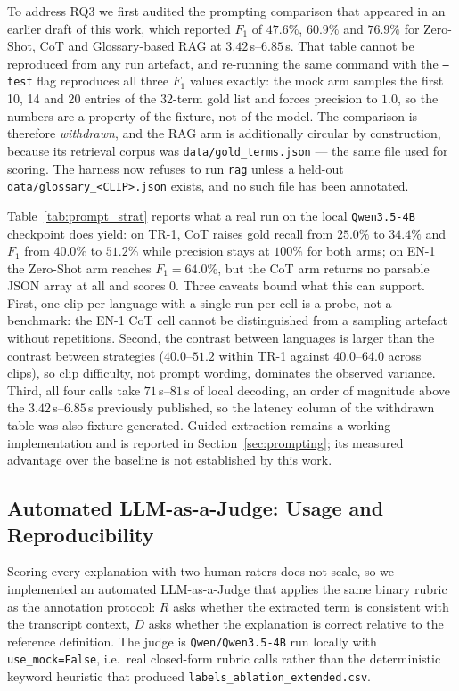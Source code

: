 \documentclass[conference]{IEEEtran}
\begin{document}
To address RQ3 we first audited the prompting comparison that appeared in an earlier
draft of this work, which reported $F_1$ of $47.6\%$, $60.9\%$ and $76.9\%$ for Zero-Shot,
CoT and Glossary-based RAG at $3.42$\,s--$6.85$\,s. That table cannot be reproduced from
any run artefact, and re-running the same command with the \texttt{--test} flag
reproduces all three $F_1$ values exactly: the mock arm samples the first 10, 14 and 20
entries of the 32-term gold list and forces precision to $1.0$, so the numbers are a
property of the fixture, not of the model. The comparison is therefore \emph{withdrawn},
and the RAG arm is additionally circular by construction, because its retrieval corpus
was \texttt{data/gold\_terms.json} --- the same file used for scoring. The harness now
refuses to run \texttt{rag} unless a held-out \texttt{data/glossary\_<CLIP>.json} exists,
and no such file has been annotated.

Table~\ref{tab:prompt_strat} reports what a real run on the local \texttt{Qwen3.5-4B}
checkpoint does yield: on TR-1, CoT raises gold recall from $25.0\%$ to $34.4\%$ and
$F_1$ from $40.0\%$ to $51.2\%$ while precision stays at $100\%$ for both arms; on EN-1
the Zero-Shot arm reaches $F_1 = 64.0\%$, but the CoT arm returns no parsable JSON array
at all and scores $0$. Three caveats bound what this can support. First, one clip per
language with a single run per cell is a probe, not a benchmark: the EN-1 CoT cell
cannot be distinguished from a sampling artefact without repetitions. Second, the
contrast between languages is larger than the contrast between strategies
($40.0$--$51.2$ within TR-1 against $40.0$--$64.0$ across clips), so clip difficulty, not
prompt wording, dominates the observed variance. Third, all four calls take $71$\,s--$81$\,s
of local decoding, an order of magnitude above the $3.42$\,s--$6.85$\,s previously
published, so the latency column of the withdrawn table was also fixture-generated.
Guided extraction remains a working implementation and is reported in
Section~\ref{sec:prompting}; its measured advantage over the baseline is not
established by this work.



\subsection{Automated LLM-as-a-Judge: Usage and Reproducibility}
\label{sec:llm-judge}

Scoring every explanation with two human raters does not scale, so we implemented an automated LLM-as-a-Judge that applies the same binary rubric as the annotation protocol: $R$ asks whether the extracted term is consistent with the transcript context, $D$ asks whether the explanation is correct relative to the reference definition. The judge is \texttt{Qwen/Qwen3.5-4B} run locally with \texttt{use\_mock=False}, i.e.\ real closed-form rubric calls rather than the deterministic keyword heuristic that produced \texttt{labels\_ablation\_extended.csv}.
\end{document}
